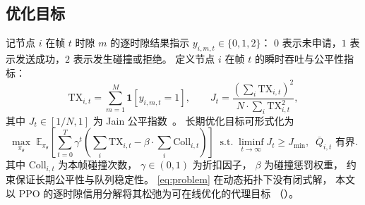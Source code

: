 \subsection{优化目标}
\label{subsec:objective}

记节点 \(i\) 在帧 \(t\) 时隙 \(m\) 的逐时隙结果指示
\(y_{i,m,t}\in\{0,1,2\}\)：
\(0\) 表示未申请，\(1\) 表示发送成功，\(2\) 表示发生碰撞或拒绝。
定义节点 \(i\) 在帧 \(t\) 的瞬时吞吐与公平性指标：
\begin{equation}
\mathrm{TX}_{i,t} = \sum_{m=1}^{M}\mathbf{1}[y_{i,m,t}=1],
\qquad
J_t = \frac{\left(\sum_i \mathrm{TX}_{i,t}\right)^2}{N\cdot\sum_i \mathrm{TX}_{i,t}^2},
\label{eq:tx-jain}
\end{equation}
其中 \(J_t\in[1/N,1]\) 为 Jain 公平指数~\cite{jain1984}。
长期优化目标可形式化为
\begin{equation}
\max_{\pi_\theta}\;
\mathbb{E}_{\pi_\theta}\!\left[
\sum_{t=0}^{T}\gamma^{t}
\left( \sum_i \mathrm{TX}_{i,t} - \beta\cdot \sum_i \mathrm{Coll}_{i,t} \right)
\right]
\;\;\text{s.t.}\;
\liminf_{t\to\infty} J_t \ge J_{\min},
\;\;
\bar{Q}_{i,t} \text{ 有界}.
\label{eq:problem}
\end{equation}
其中 \(\mathrm{Coll}_{i,t}\) 为本帧碰撞次数，
\(\gamma\in(0,1)\) 为折扣因子，
\(\beta\) 为碰撞惩罚权重，
约束保证长期公平性与队列稳定性。
\eqref{eq:problem} 在动态拓扑下没有闭式解，
本文以 PPO 的逐时隙信用分解将其松弛为可在线优化的代理目标
（）。
